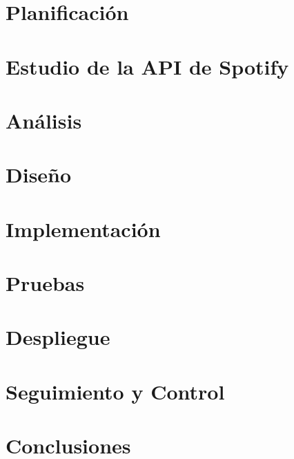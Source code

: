 \documentclass[a4paper, 11pt, oneside]{memoir}
\begin{document}
\chapter{Planificación} \label{ch:planificacion}

\cleardoublepage

\chapter{Estudio de la API de Spotify} \label{ch:estudioApiSpotify}

\cleardoublepage

\chapter{Análisis} \label{ch:analisis}

\cleardoublepage

\chapter{Diseño} \label{ch:diseño}

\cleardoublepage

\chapter{Implementación} \label{ch:implementacion}

\cleardoublepage

\chapter{Pruebas} \label{ch:pruebas}

\cleardoublepage

\chapter{Despliegue} \label{ch:despliegue}

\cleardoublepage

\chapter{Seguimiento y Control} \label{ch:seguimientoControl}

\cleardoublepage

\chapter{Conclusiones} \label{ch:conclusiones}

\cleardoublepage
\end{document}
